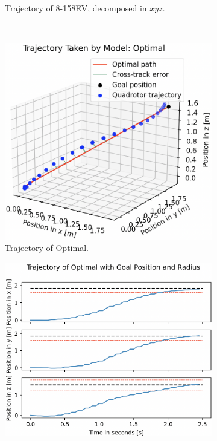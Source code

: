 \begin{figure}[H]
\begin{subfigure}[b]{0.49\textwidth}
         \caption{Trajectory of 8-158EV, decomposed in $xyz$.}
         \label{fig:testing_ppo8158EV2}
     \end{subfigure} 
     \hfill \\[1mm]
    \begin{subfigure}[b]{0.48\textwidth}
         \centering
         \captionsetup{justification=centering}
         \includegraphics[width=\textwidth]{figures/5_/Testing/ppo_test_optimal1.png}
         \caption{Trajectory of Optimal.}
         \label{fig:testing_ppoOptimal1}
     \end{subfigure} 
     \hfill 
     \begin{subfigure}[b]{0.49\textwidth}
         \centering
         \captionsetup{justification=centering}
         \includegraphics[width=\textwidth]{figures/5_/Testing/ppo_test_optimal2.png}

\end{subfigure}
\end{figure}
